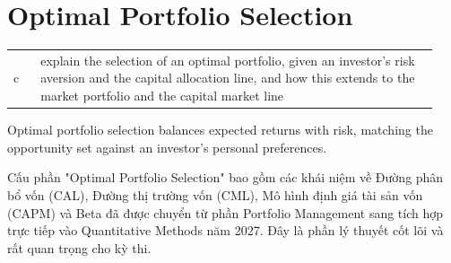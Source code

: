 \section{Optimal Portfolio Selection}
\label{sec:Optimal Portfolio Selection}
\begin{center}
\begin{tabular}{p{0.06\linewidth} | p{0.88\linewidth}}
	c & explain the selection of an optimal portfolio, given an investor's risk aversion and the capital allocation line, and how this extends to the market portfolio and the capital market line \\
\end{tabular}
\end{center}
Optimal portfolio selection balances expected returns with risk, matching the opportunity set against an investor's personal preferences.
\begin{examtip}[title={Cập nhật chương trình 2027}, colframe=red!75!black, colback=red!5!white]
Cấu phần "Optimal Portfolio Selection" bao gồm các khái niệm về Đường phân bổ vốn (CAL), Đường thị trường vốn (CML), Mô hình định giá tài sản vốn (CAPM) và Beta đã được chuyển từ phần Portfolio Management sang tích hợp trực tiếp vào Quantitative Methods năm 2027. Đây là phần lý thuyết cốt lõi và rất quan trọng cho kỳ thi.
\end{examtip}
